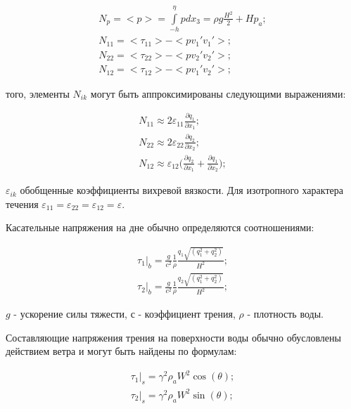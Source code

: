 \documentclass[14pt]{extreport}
\begin{document}

\begin{equation}\label{eq:shallow_water:18}
\begin{aligned}
N_p = <p> = \int\limits^\eta_{-h} pdx_3=\rho g \frac{H^2}{2} + Hp_a; \\
N_{11} = <\tau_{11}>-<pv_1'v_1'>; \\
N_{22} = <\tau_{22}>-<pv_2'v_2'>; \\
N_{12} = <\tau_{12}>-<pv_1'v_2'>;
\end{aligned}
\end{equation}

 того, элементы $N_{ik}$ могут быть аппроксимированы следующими выражениями:

\begin{equation}\label{eq:shallow_water:19}
\begin{aligned}
N_{11} \approx 2 \varepsilon_{11}\frac{\partial q_1}{\partial x_1}; \\
N_{22} \approx 2 \varepsilon_{22}\frac{\partial q_2}{\partial x_2}; \\
N_{12} \approx \varepsilon_{12}\bigg(\frac{\partial q_2}{\partial x_1}+\frac{\partial q_1}{\partial x_2}\bigg);
\end{aligned}
\end{equation}


 $\varepsilon_{ik}$ обобщенные коэффициенты вихревой вязкости. Для изотропного характера течения $\varepsilon_{11}=\varepsilon_{22}=\varepsilon_{12}=\varepsilon.$

Касательные напряжения на дне обычно определяются соотношениями:

\begin{equation}\label{eq:shallow_water:20}
\begin{aligned}
\tau_1\bigg|_b = \frac{g}{c^2} \frac{1}{\rho} \frac{q_1\sqrt{(q_1^2+q_2^2)}}{H^2}; \\
\tau_2\bigg|_b = \frac{g}{c^2} \frac{1}{\rho} \frac{q_2\sqrt{(q_1^2+q_2^2)}}{H^2};
\end{aligned}
\end{equation}

 $g$ - ускорение силы тяжести, $с$ - коэффициент трения, $\rho$ - плотность воды. 

Составляющие напряжения трения на поверхности воды обычно обусловлены действием ветра и могут быть найдены по формулам:

\begin{equation}\label{eq:shallow_water:21}
\begin{aligned}
\tau_1\bigg|_s=\gamma^2\rho_aW^2\cos(\theta);\\
\tau_2\bigg|_s=\gamma^2\rho_aW^2\sin(\theta);
\end{aligned}
\end{equation}
\end{document}
